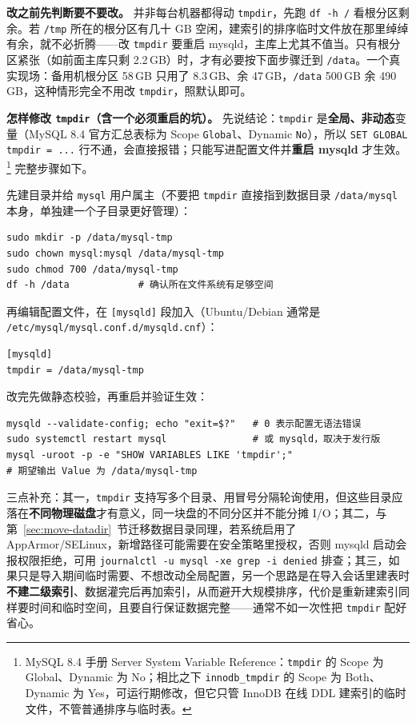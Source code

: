 \documentclass[12pt,UTF8]{ctexbook}
\begin{document}
\textbf{改之前先判断要不要改。} 并非每台机器都得动 \texttt{tmpdir}，先跑 \texttt{df -h /} 看根分区剩余。若 \texttt{/tmp} 所在的根分区有几十 GB 空闲，建索引的排序临时文件放在那里绰绰有余，就不必折腾——改 \texttt{tmpdir} 要重启 mysqld，主库上尤其不值当。只有根分区紧张（如前面主库只剩 2.2\,GB）时，才有必要按下面步骤迁到 \texttt{/data}。一个真实现场：备用机根分区 58\,GB 只用了 8.3\,GB、余 47\,GB，\texttt{/data} 500\,GB 余 490\,GB，这种情形完全不用改 \texttt{tmpdir}，照默认即可。

\textbf{怎样修改 \texttt{tmpdir}（含一个必须重启的坑）。} 先说结论：\texttt{tmpdir} 是\textbf{全局、非动态}变量（MySQL 8.4 官方汇总表标为 Scope \texttt{Global}、Dynamic \texttt{No}），所以 \texttt{SET GLOBAL tmpdir = ...} 行不通，会直接报错；只能写进配置文件并\textbf{重启 mysqld} 才生效。\footnote{MySQL 8.4 手册 Server System Variable Reference：\texttt{tmpdir} 的 Scope 为 Global、Dynamic 为 No；相比之下 \texttt{innodb\_tmpdir} 的 Scope 为 Both、Dynamic 为 Yes，可运行期修改，但它只管 InnoDB 在线 DDL 建索引的临时文件，不管普通排序与临时表。} 完整步骤如下。

先建目录并给 \texttt{mysql} 用户属主（不要把 \texttt{tmpdir} 直接指到数据目录 \texttt{/data/mysql} 本身，单独建一个子目录更好管理）：

\begin{lstlisting}
sudo mkdir -p /data/mysql-tmp
sudo chown mysql:mysql /data/mysql-tmp
sudo chmod 700 /data/mysql-tmp
df -h /data            # 确认所在文件系统有足够空间
\end{lstlisting}

再编辑配置文件，在 \texttt{[mysqld]} 段加入（Ubuntu/Debian 通常是 \texttt{/etc/mysql/mysql.conf.d/mysqld.cnf}）：

\begin{lstlisting}
[mysqld]
tmpdir = /data/mysql-tmp
\end{lstlisting}

改完先做静态校验，再重启并验证生效：

\begin{lstlisting}
mysqld --validate-config; echo "exit=$?"   # 0 表示配置无语法错误
sudo systemctl restart mysql               # 或 mysqld，取决于发行版
mysql -uroot -p -e "SHOW VARIABLES LIKE 'tmpdir';"
# 期望输出 Value 为 /data/mysql-tmp
\end{lstlisting}

三点补充：其一，\texttt{tmpdir} 支持写多个目录、用冒号分隔轮询使用，但这些目录应落在\textbf{不同物理磁盘}才有意义，同一块盘的不同分区并不能分摊 I/O；其二，与第~\ref{sec:move-datadir}~节迁移数据目录同理，若系统启用了 AppArmor/SELinux，新增路径可能需要在安全策略里授权，否则 mysqld 启动会报权限拒绝，可用 \texttt{journalctl -u mysql -xe \textbar{} grep -i denied} 排查；其三，如果只是导入期间临时需要、不想改动全局配置，另一个思路是在导入会话里建表时\textbf{不建二级索引}、数据灌完后再加索引，从而避开大规模排序，代价是重新建索引同样要时间和临时空间，且要自行保证数据完整——通常不如一次性把 \texttt{tmpdir} 配好省心。
\end{document}
